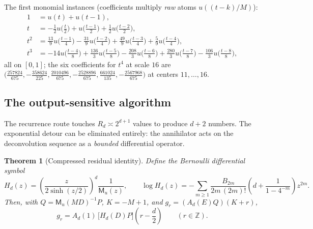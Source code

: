 \documentclass[11pt,oneside]{article}
\numberwithin{equation}{section}
\newtheorem{theorem}{Theorem}[section]
\theoremstyle{definition}
\theoremstyle{remark}
\newcommand{\Z}{\mathbb Z}
\newcommand{\MM}{\mathsf M}
\begin{document}
The first monomial instances (coefficients multiply \emph{raw} atoms
$u((t-k)/M)$):
\begin{align}
 1&=u(t)+u(t-1),\\
 t&=-\tfrac12u\bigl(\tfrac t2\bigr)
 +u\bigl(\tfrac{t-1}2\bigr)
 +\tfrac12u\bigl(\tfrac{t-2}2\bigr),\\
 t^{2}&=\tfrac{13}9u\bigl(\tfrac{t-1}4\bigr)
 -\tfrac{31}9u\bigl(\tfrac{t-2}4\bigr)
 +\tfrac{49}9u\bigl(\tfrac{t-3}4\bigr)
 +\tfrac59u\bigl(\tfrac{t-4}4\bigr),\\
 t^{3}&=-14u\bigl(\tfrac{t-4}8\bigr)
 +\tfrac{136}3u\bigl(\tfrac{t-5}8\bigr)
 -\tfrac{208}3u\bigl(\tfrac{t-6}8\bigr)
 +\tfrac{280}3u\bigl(\tfrac{t-7}8\bigr)
 -\tfrac{106}3u\bigl(\tfrac{t-8}8\bigr),
 \label{eq:monomial-examples}
\end{align}
all on $[0,1]$; the six coefficients for $t^{4}$ at scale $16$ are
$\bigl(\tfrac{257824}{675},-\tfrac{358624}{225},
\tfrac{2010496}{675},-\tfrac{2528896}{675},
\tfrac{661024}{135},-\tfrac{2567968}{675}\bigr)$ at centers
$11,\dots,16$.

\subsection{The output-sensitive algorithm}
\label{sec:fast}

The recurrence route touches $R_d\asymp2^{d+1}$ values to produce
$d+2$ numbers.  The exponential detour can be eliminated entirely: the
annihilator acts on the deconvolution sequence as a \emph{bounded}
differential operator.

\begin{theorem}[Compressed residual identity]
\label{thm:H-identity}
Define the Bernoulli differential symbol
\begin{equation}
 H_d(z)=\left(\frac{z}{2\sinh(z/2)}\right)^{\!d}\frac{1}{\MM_u(z)},
 \qquad
 \log H_d(z)=
 -\sum_{m\ge1}\frac{B_{2m}}{2m\,(2m)!}
 \left(d+\frac{1}{1-4^{-m}}\right)z^{2m}.
 \label{eq:H-def}
\end{equation}
Then, with $Q=\MM_u(MD)^{-1}P$, $K=-M+1$, and
$g_r=(A_d(E)Q)(K+r)$,
\begin{equation}
 \boxed{\;
 g_r=A_d(1)\,\bigl[H_d(D)P\bigr]\!\left(r-\frac d2\right)
 \qquad(r\in\Z).
 \;}
 \label{eq:g-fast}
\end{equation}
\end{theorem}
\end{document}
